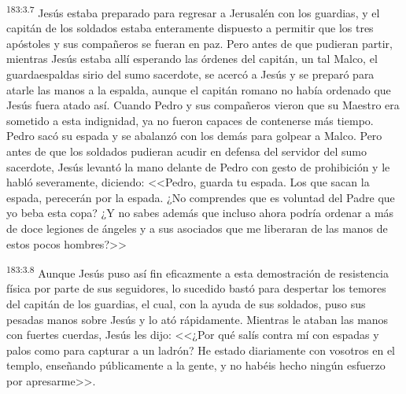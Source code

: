 \par 
\textsuperscript{183:3.7} Jesús estaba preparado para regresar a Jerusalén con los guardias, y el capitán de los soldados estaba enteramente dispuesto a permitir que los tres apóstoles y sus compañeros se fueran en paz. Pero antes de que pudieran partir, mientras Jesús estaba allí esperando las órdenes del capitán, un tal Malco, el guardaespaldas sirio del sumo sacerdote, se acercó a Jesús y se preparó para atarle las manos a la espalda, aunque el capitán romano no había ordenado que Jesús fuera atado así. Cuando Pedro y sus compañeros vieron que su Maestro era sometido a esta indignidad, ya no fueron capaces de contenerse más tiempo. Pedro sacó su espada y se abalanzó con los demás para golpear a Malco. Pero antes de que los soldados pudieran acudir en defensa del servidor del sumo sacerdote, Jesús levantó la mano delante de Pedro con gesto de prohibición y le habló severamente, diciendo: <<Pedro, guarda tu espada. Los que sacan la espada, perecerán por la espada. ¿No comprendes que es voluntad del Padre que yo beba esta copa? ¿Y no sabes además que incluso ahora podría ordenar a más de doce legiones de ángeles y a sus asociados que me liberaran de las manos de estos pocos hombres?>>

\par 
\textsuperscript{183:3.8} Aunque Jesús puso así fin eficazmente a esta demostración de resistencia física por parte de sus seguidores, lo sucedido bastó para despertar los temores del capitán de los guardias, el cual, con la ayuda de sus soldados, puso sus pesadas manos sobre Jesús y lo ató rápidamente. Mientras le ataban las manos con fuertes cuerdas, Jesús les dijo: <<¿Por qué salís contra mí con espadas y palos como para capturar a un ladrón? He estado diariamente con vosotros en el templo, enseñando públicamente a la gente, y no habéis hecho ningún esfuerzo por apresarme>>.

